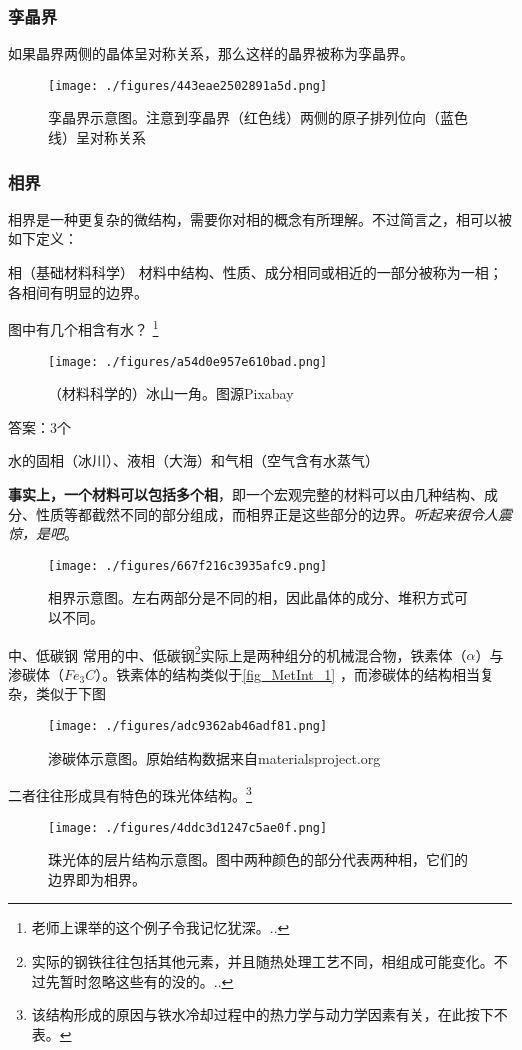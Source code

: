 \subsubsection{孪晶界}
如果晶界两侧的晶体呈对称关系，那么这样的晶界被称为孪晶界。
\begin{figure}[ht]
\centering
\texttt{[image: ./figures/443eae2502891a5d.png]}
\caption{孪晶界示意图。注意到孪晶界（红色线）两侧的原子排列位向（蓝色线）呈对称关系} \label{fig_MetInt_12}
\end{figure}

\subsubsection{相界}
相界是一种更复杂的微结构，需要你对相的概念有所理解。不过简言之，相可以被如下定义：
\begin{definition}{相（基础材料科学）}
材料中结构、性质、成分相同或相近的一部分被称为一相；各相间有明显的边界。
\end{definition}

\begin{example}{图中有几个相含有水？}
\footnote{老师上课举的这个例子令我记忆犹深。..}
\begin{figure}[ht]
\centering
\texttt{[image: ./figures/a54d0e957e610bad.png]}
\caption{（材料科学的）冰山一角。图源Pixabay} \label{fig_MetInt_14}
\end{figure}
答案：3个

水的固相（冰川）、液相（大海）和气相（空气含有水蒸气）
\end{example}

\textbf{事实上，一个材料可以包括多个相}，即一个宏观完整的材料可以由几种结构、成分、性质等都截然不同的部分组成，而相界正是这些部分的边界。\textsl{听起来很令人震惊，是吧}。
\begin{figure}[ht]
\centering
\texttt{[image: ./figures/667f216c3935afc9.png]}
\caption{相界示意图。左右两部分是不同的相，因此晶体的成分、堆积方式可以不同。} \label{fig_MetInt_22}
\end{figure}

\begin{example}{中、低碳钢}
常用的中、低碳钢\footnote{实际的钢铁往往包括其他元素，并且随热处理工艺不同，相组成可能变化。不过先暂时忽略这些有的没的。..}实际上是两种组分的机械混合物，铁素体（$\alpha$）与渗碳体（$Fe_3C$）。铁素体的结构类似于\autoref{fig_MetInt_1} ，而渗碳体的结构相当复杂，类似于下图
\begin{figure}[ht]
\centering
\texttt{[image: ./figures/adc9362ab46adf81.png]}
\caption{渗碳体示意图。原始结构数据来自materialsproject.org} \label{fig_MetInt_15}
\end{figure}
二者往往形成具有特色的珠光体结构。\footnote{该结构形成的原因与铁水冷却过程中的热力学与动力学因素有关，在此按下不表。}
\begin{figure}[ht]
\centering
\texttt{[image: ./figures/4ddc3d1247c5ae0f.png]}
\caption{珠光体的层片结构示意图。图中两种颜色的部分代表两种相，它们的边界即为相界。} \label{fig_MetInt_16}
\end{figure}
\end{example}

